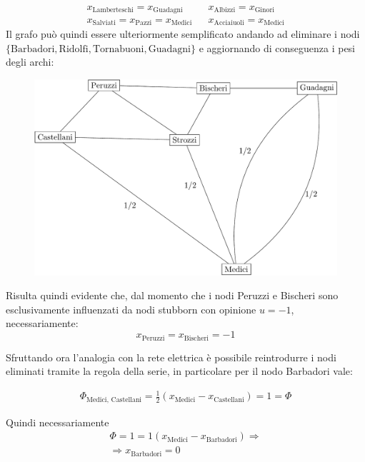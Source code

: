\documentclass[11pt,largemargins]{homework}
\begin{document}
\begin{alphaparts}
  \begin{align*}
    x_{\text{Lamberteschi}}=x_{\text{Guadagni}} && x_{\text{Albizzi}}=x_{\text{Ginori}} \\ x_{\text{Salviati}}=x_{\text{Pazzi}}=x_{\text{Medici}} && x_{\text{Acciaiuoli}}=x_{\text{Medici}} 
  \end{align*}
  \newpage
  Il grafo può quindi essere ulteriormente semplificato andando ad eliminare i nodi \(\{\text{Barbadori}, \text{Ridolfi}, \text{Tornabuoni}, \text{Guadagni}\}\) e aggiornando di conseguenza i pesi degli archi:

  \begin{figure}[H]
    \center
    \includegraphics[scale=0.35]{Grap_Series.png}
  \end{figure}

  Risulta quindi evidente che, dal momento che i nodi Peruzzi e Bischeri sono esclusivamente influenzati da nodi stubborn con opinione \(u=-1\), necessariamente:
  \begin{equation*}
    x_{\text{Peruzzi}}=x_{\text{Bischeri}}=-1
  \end{equation*}

  Sfruttando ora l'analogia con la rete elettrica è possibile reintrodurre i nodi eliminati tramite la regola della serie, in particolare per il nodo Barbadori vale:

  \begin{gather*}
    \Phi_{\text{Medici, Castellani}}=\frac{1}{2}\left(x_{\text{Medici}}-x_{\text{Castellani}}\right)=1=\Phi
  \end{gather*}

  Quindi necessariamente
  \begin{gather*}
    \Phi = 1 = 1\left(x_{\text{Medici}}-x_{\text{Barbadori}}\right) \Rightarrow\\
    \Rightarrow x_{\text{Barbadori}} = 0
  \end{gather*}


\end{alphaparts}
\end{document}
